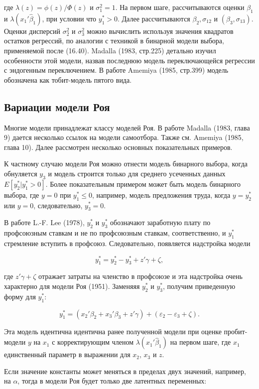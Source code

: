 где $\lambda(z)=\phi(z)/\Phi(z)$ и $\sigma_1^{2}=1$. На первом шаге, рассчитываются оценки $\beta_1$ и $\lambda(x_1'\hat{\beta}_1)$, при условии что $y_1^{*}>0$. Далее рассчитываются $\beta_2, \sigma_{12}$ и $(\beta_3,\sigma_{13})$. Оценки дисперсий $\sigma_2^2$ и $\sigma_3^2$ можно вычислить используя значения квадратов остатков регрессий, по аналогии с техникой в бинарной модели выбора, применяемой после (16.40). Madalla (1983, стр.225) детально изучил особенности этой модели, назвав последнюю модель переключающейся регрессии с эндогенным переключением. В работе Amemiya (1985, стр.399) модель обозначена как тобит-модель пятого вида.

\subsection{Вариации модели Роя}

Многие модели принадлежат классу моделей Роя. В работе Madalla (1983, глава 9) дается несколько ссылок  на модели самоотбора. Также см. Amemiya (1985, глава 10). Далее рассмотрен несколько основных показательных примеров.

К частному случаю модели Роя можно отнести модель бинарного выбора, когда обнуляется $y_3$ и модель строится только для среднего усеченных данных $E[y_2^{*}|y_1^{*}>0]$. Более показательным примером может быть модель бинарного выбора, где $y=0$ при $y_1^{*}{\leq}0$, например, модель предложения труда, когда $y=y_2^{*}$ или $y=0$, следовательно, $y_3^{*}=0$.

В работе L.-F. Lee (1978), $y_2^{*}$ и $y_3^{*}$ обозначают заработную плату по профсоюзным ставкам и не по профсоюзным ставкам, соответственно, и $y_1^{*}$ стремление вступить в профсоюз. Следовательно, появляется надстройка модели

\[
y_1^{*}=y_2^{*}-y_3^{*}+z'\gamma+\zeta,
\]

где $z'\gamma+\zeta$ отражает затраты на членство в профсоюзе и эта надстройка очень характерно для модели Роя (1951). Заменяяя $y_2^{*}$ и $y_3^{*}$, получим приведенную форму для $y_1^{*}$:

\[
y_1^{*}=(x_2'\beta_2+x_3'\beta_3+z'\gamma)+(\varepsilon_2-\varepsilon_3+\zeta).
\]

Эта модель идентична идентична ранее полученной модели при оценке пробит-модели $y$ на $x_1$ с корректирующим членом $\lambda(x_1'\hat{\beta}_1)$ на первом шаге, где $x_1$ единственный параметр в выражении для $x_2$, $x_3$ и $z$.

Если значение константы может меняться в пределах двух значений, например, на $\alpha$, тогда в модели Роя будет только две латентных переменных:


